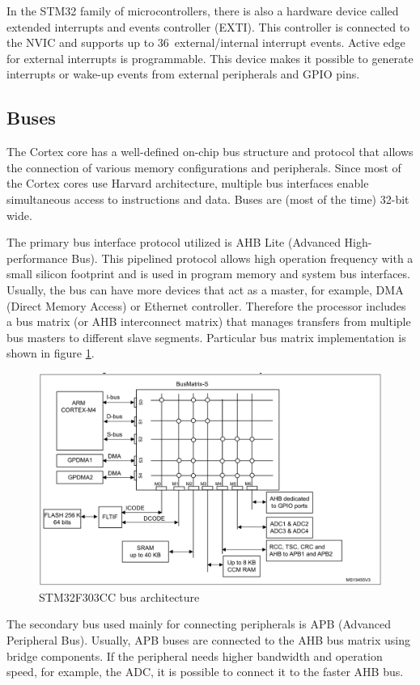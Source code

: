 In the  STM32 family of microcontrollers, there is also a hardware device called extended interrupts and events controller (EXTI). This controller is connected to the NVIC and supports up to 36~external/internal interrupt events. Active edge for external interrupts is programmable. This device makes it possible to generate interrupts or wake-up events from external peripherals and GPIO pins.

	\subsection{Buses}
	\label{sub:buses}
The Cortex core has a well-defined on-chip bus structure and protocol that allows the connection of various memory configurations and peripherals. Since most of the Cortex cores use Harvard architecture, multiple bus interfaces enable simultaneous access to instructions and data. Buses are (most of the time) 32-bit wide.

The primary bus interface protocol utilized is AHB Lite (Advanced High-performance Bus). This pipelined protocol allows high operation frequency with a small silicon footprint and is used in program memory and system bus interfaces. Usually, the bus can have more devices that act as a master, for example, DMA (Direct Memory Access) or Ethernet controller. Therefore the processor includes a bus matrix (or AHB interconnect matrix) that manages transfers from multiple bus masters to different slave segments. Particular bus matrix implementation is shown in figure \ref{fig:f303_busmatrix}.
\begin{figure}
\centering
\includegraphics[width=0.7\linewidth]{support/pic/f303_bus_matrix.png}
\caption{STM32F303CC bus architecture \cite{f303_ref}}
\label{fig:f303_busmatrix}
\end{figure}

The secondary bus used mainly for connecting peripherals is APB (Advanced Peripheral Bus). Usually, APB buses are connected to the AHB bus matrix using bridge components. If the peripheral needs higher bandwidth and operation speed, for example, the ADC, it is possible to connect it to the faster AHB bus.

